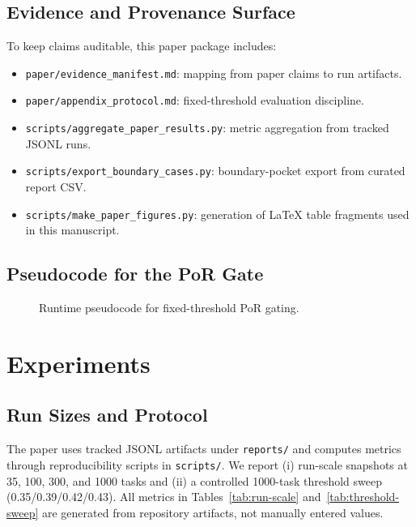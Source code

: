 \documentclass[11pt]{article}
\begin{document}
\subsection{Evidence and Provenance Surface}
To keep claims auditable, this paper package includes:
\begin{itemize}[leftmargin=1.5em]
    \item \texttt{paper/evidence\_manifest.md}: mapping from paper claims to run artifacts.
    \item \texttt{paper/appendix\_protocol.md}: fixed-threshold evaluation discipline.
    \item \texttt{scripts/aggregate\_paper\_results.py}: metric aggregation from tracked JSONL runs.
    \item \texttt{scripts/export\_boundary\_cases.py}: boundary-pocket export from curated report CSV.
    \item \texttt{scripts/make\_paper\_figures.py}: generation of LaTeX table fragments used in this manuscript.
\end{itemize}

\subsection{Pseudocode for the PoR Gate}
\begin{figure}[H]
\centering
{}
\caption{Runtime pseudocode for fixed-threshold PoR gating.}
\label{fig:pseudocode}
\end{figure}

\section{Experiments}
\subsection{Run Sizes and Protocol}
The paper uses tracked JSONL artifacts under \texttt{reports/} and computes metrics through reproducibility scripts in \texttt{scripts/}. We report (i) run-scale snapshots at 35, 100, 300, and 1000 tasks and (ii) a controlled 1000-task threshold sweep (0.35/0.39/0.42/0.43). All metrics in Tables~\ref{tab:run-scale} and~\ref{tab:threshold-sweep} are generated from repository artifacts, not manually entered values.
\end{document}
